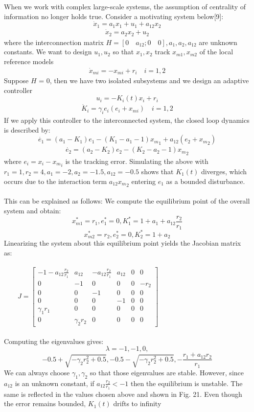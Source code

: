 \documentclass[journal]{IEEEtran}
\begin{document}
When we work with complex large-scale systems, the assumption of centrality of information no longer holds true. Consider a motivating system below[9]: $$\dot{x}_1 = a_1x_1+u_1+a_{12}x_2$$\begin{align}\dot{x}_2=a_2x_2+u_2\end{align}where the interconnection matrix $H = [0 \quad a_{12};0\quad 0], a_1,a_2,a_{12}$ are unknown constants. We want to design $u_1,u_2$ so that $x_1,x_2$ track $x_{m1},x_{m2}$ of the local reference models  \begin{align}\dot{x}_{mi} = -x_{mi}+r_i \quad i=1,2\end{align} Suppose $H$ = 0, then we have two isolated subsystems and we design an adaptive controller $$u_i = -K_i(t)x_i+r_i$$\begin{align}\dot{K}_i = \gamma_ie_i(e_i+x_{mi})\quad i=1,2\end{align} If we apply this controller to the interconnected system, the closed loop dynamics is described by: $$ \dot{e_1}=(a_1-K_1)e_1-(K_1-a_1-1){x_m}_1+a_{12}(e_2+{x_m}_2)$$ \begin{align}\dot{e_2}=(a_2-K_2)e_2-(K_2-a_2-1){x_m}_2\end{align}where $e_i=x_i-{x_m}_i$ is the tracking error. Simulating the above with $r_1=1,r_2=4,a_1=-2,a_2=-1.5,a_{12}=-0.5$ shows that $K_1(t)$ diverges, which occurs due to the interaction term $a_{12}{x_m}_2$ entering $e_1$ as a bounded disturbance. \\\\ This can be explained as follows: We compute the equilibrium point of the overall system and obtain: $$x^*_{m1} = r_1, e^*_1=0, K^*_1 = 1+a_1+a_{12}\frac{r_2}{r_1}$$$$x^*_{m2} = r_2, e^*_2=0, K^*_2 = 1+a_2$$ Linearizing the system about this equilibrium point yields the Jacobian matrix as: \\\\ $ \qquad J = \begin{bmatrix}
-1-a_{12}\frac{r_2}{r_1} & a_{12} & -a_{12}\frac{r_2}{r_1}  & a_{12} &0 &0 \\
0 &-1&0&0&0&-r_2\\ 0&0&-1&0&0&0 \\ 0&0&0&-1&0&0\\ \gamma_1 r_1 &0&0&0&0&0 \\ 0&\gamma_2 r_2 &0&0&0&0 

\end{bmatrix}$
\\\\
Computing the eigenvalues gives: $$ \lambda = -1,-1,0,$$$$-0.5+\sqrt{-\gamma_2 r^2_2+0.5}, -0.5-\sqrt{-\gamma_2 r^2_2+0.5}, -\frac{r_1+a_{12}r_2}{r_1}$$We can always choose $\gamma_1 , \gamma_2$ so that those eigenvalues are stable. However, since $a_{12}$ is an unknown constant, if $a_{12}\frac{r_2}{r_1} < -1$ then the equilibrium is unstable. The same is reflected in the values chosen above and shown in Fig. 21. Even though the error remains bounded, $K_1(t)$ drifts to infinity
\end{document}
